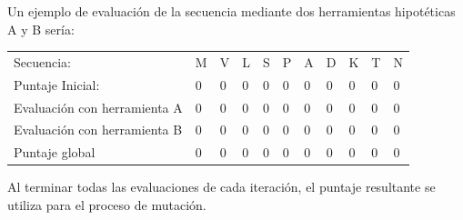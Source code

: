 Un ejemplo de evaluación de la secuencia mediante dos herramientas hipotéticas A y B sería: %
\rule[-0.7\baselineskip]{0pt}{\baselineskip}
\begin{tabular}{lllllllllll} 
Secuencia: &  M & V & L & S & P & A & D & K & T & N\\ 
Puntaje Inicial: & 0 & 0 & 0 & 0 & 0 & 0 & 0 & 0 & 0 & 0\\
Evaluación con herramienta A & 0 & 0 & 0 & 0 & 0 & 0 & 0 & 0 & 0 & 0\\
Evaluación con herramienta B & 0 & 0 & 0 & 0 & 0 & 0 & 0 & 0 & 0 & 0\\
Puntaje global & 0 & 0 & 0 & 0 & 0 & 0 & 0 & 0 & 0 & 0\\
\end{tabular}


Al terminar todas las evaluaciones de cada iteración, el puntaje resultante se utiliza para el proceso de mutación.


